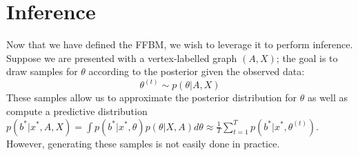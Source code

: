 \section{Inference}
\label{sec:inference}

Now that we have defined the FFBM, we wish to leverage it to perform inference. Suppose we are presented with a vertex-labelled graph $(A, X)$; the goal is to draw samples for $\theta$ according to the posterior given the observed data:
%
\begin{equation}
	\label{eqn:theta-target}
	\theta^{(t)} \sim p(\theta | A, X)
\end{equation}
%
These samples allow us to approximate the posterior distribution for $\theta$ as well as compute a predictive distribution $p(b^* | x^*, A, X) = \int p(b^* | x^*, \theta) p(\theta | X, A) d\theta \approx \frac{1}{T} \sum_{t=1}^{T} p(b^* | x^*, \theta^{(t)})$. However, generating these samples is not easily done in practice.

